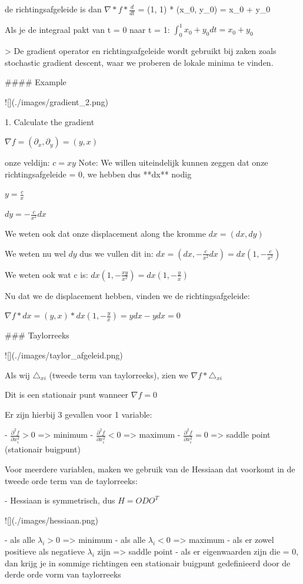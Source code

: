 \documentclass[a4paper]{article}
\begin{document}
de richtingsafgeleide is dan $\nabla * f * \frac{d}{dt}$ = (1, 1) * (x_0, y_0) = x_0 + y_0

Als je de integraal pakt van t = 0 naar t = 1: $\int_0^1 x_0 + y_0 dt = x_0 + y_0$

> De gradient operator en richtingsafgeleide wordt gebruikt bij zaken zoals stochastic gradient descent, waar we proberen de lokale minima te vinden.

#### Example

![](./images/gradient_2.png)

1. Calculate the gradient

$\nabla f = (\partial_x, \partial_y) = (y, x)$

onze veldijn: $c = xy$
Note: We willen uiteindelijk kunnen zeggen dat onze richtingsafgeleide = 0, we hebben dus **dx** nodig

$y = \frac{c}{x}$

$dy = - \frac{c}{x^2} dx$

We weten ook dat onze displacement along the kromme $dx = (dx, dy)$

We weten nu wel $dy$ dus we vullen dit in: $dx = (dx, - \frac{c}{x^2} dx) = dx(1, - \frac{c}{x^2})$

We weten ook wat c is: $dx(1, - \frac{xy}{x^2}) = dx(1, - \frac{y}{x})$

Nu dat we de displacement hebben, vinden we de richtingsafgeleide:

$\nabla f * dx = (y, x) * dx(1, - \frac{y}{x}) = ydx - ydx = 0$

### Taylorreeks

![](./images/taylor_afgeleid.png)

Als wij $\triangle_{xi}$ (tweede term van taylorreeks), zien we $\nabla f * \triangle_{xi}$

Dit is een stationair punt wanneer $\nabla f = 0$

Er zijn hierbij 3 gevallen voor 1 variable:

- $\frac{\partial^2 f}{\partial x_i^2} > 0$ => minimum
- $\frac{\partial^2 f}{\partial x_i^2} < 0$ => maximum
- $\frac{\partial^2 f}{\partial x_i^2} = 0$ => saddle point (stationair buigpunt)

Voor meerdere variablen, maken we gebruik van de Hessiaan dat voorkomt in de tweede orde term van de taylorreeks:

- Hessiaan is symmetrisch, dus $H = O D O^T$

![](./images/hessiaan.png)

- als alle $\lambda_i > 0$ => minimum
- als alle $\lambda_i < 0$ => maximum
- als er zowel positieve als negatieve $\lambda_i$ zijn => saddle point
- als er eigenwaarden zijn die = 0, dan krijg je in sommige richtingen een stationair buigpunt gedefinieerd door de derde orde vorm van taylorreeks
\end{document}
